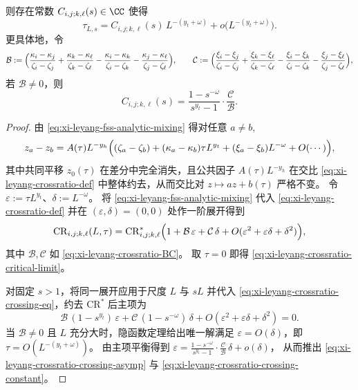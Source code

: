 \begin{theorem}
\begin{enumerate}
  则存在常数 \(C_{i,j;k,\ell}(s)\in\CC\) 使得
  \begin{equation}\label{eq:xi-leyang-crossratio-crossing-asymp}
  \tau_{L,s}
  =
  C_{i,j;k,\ell}(s)\,L^{-(y_t+\omega)}+o\!\bigl(L^{-(y_t+\omega)}\bigr).
  \end{equation}
  更具体地，令
  \begin{equation}\label{eq:xi-leyang-crossratio-BC}
  \mathcal B:=
  \Bigl(\frac{\kappa_i-\kappa_j}{\zeta_i-\zeta_j}+\frac{\kappa_k-\kappa_\ell}{\zeta_k-\zeta_\ell}
  -\frac{\kappa_i-\kappa_k}{\zeta_i-\zeta_k}-\frac{\kappa_j-\kappa_\ell}{\zeta_j-\zeta_\ell}\Bigr),
  \qquad
  \mathcal C:=
  \Bigl(\frac{\xi_i-\xi_j}{\zeta_i-\zeta_j}+\frac{\xi_k-\xi_\ell}{\zeta_k-\zeta_\ell}
  -\frac{\xi_i-\xi_k}{\zeta_i-\zeta_k}-\frac{\xi_j-\xi_\ell}{\zeta_j-\zeta_\ell}\Bigr),
  \end{equation}
  若 \(\mathcal B\neq 0\)，则
  \begin{equation}\label{eq:xi-leyang-crossratio-crossing-constant}
  C_{i,j;k,\ell}(s)=\frac{1-s^{-\omega}}{s^{y_t}-1}\cdot\frac{\mathcal C}{\mathcal B}.
  \end{equation}
\end{enumerate}
\end{theorem}
\begin{proof}
由 \eqref{eq:xi-leyang-fss-analytic-mixing} 得对任意 \(a\neq b\),
\[
z_a-z_b
=
A(\tau)L^{-y_h}\Bigl((\zeta_a-\zeta_b)+(\kappa_a-\kappa_b)\tau L^{y_t}+(\xi_a-\xi_b)L^{-\omega}+O(\cdots)\Bigr),
\]
其中共同平移 \(z_0(\tau)\) 在差分中完全消失，且公共因子 \(A(\tau)L^{-y_h}\) 在交比 \eqref{eq:xi-leyang-crossratio-def} 中整体约去，从而交比对 \(z\mapsto az+b(\tau)\) 严格不变。
令 \(\varepsilon:=\tau L^{y_t}\)、\(\delta:=L^{-\omega}\)。
将 \eqref{eq:xi-leyang-fss-analytic-mixing} 代入 \eqref{eq:xi-leyang-crossratio-def} 并在 \((\varepsilon,\delta)=(0,0)\) 处作一阶展开得到
\[
\mathrm{CR}_{i,j;k,\ell}(L,\tau)
=
\mathrm{CR}_{i,j;k,\ell}^{\ast}
\Bigl(1+\mathcal B\,\varepsilon+\mathcal C\,\delta+O(\varepsilon^{2}+\varepsilon\delta+\delta^{2})\Bigr),
\]
其中 \(\mathcal B,\mathcal C\) 如 \eqref{eq:xi-leyang-crossratio-BC}。
取 \(\tau=0\) 即得 \eqref{eq:xi-leyang-crossratio-critical-limit}。
\par
对固定 \(s>1\)，将同一展开应用于尺度 \(L\) 与 \(sL\) 并代入 \eqref{eq:xi-leyang-crossratio-crossing-eq}，约去 \(\mathrm{CR}^{\ast}\) 后主项为
\[
\mathcal B\,(1-s^{y_t})\,\varepsilon+\mathcal C\,(1-s^{-\omega})\,\delta
+O(\varepsilon^{2}+\varepsilon\delta+\delta^{2})
=0.
\]
当 \(\mathcal B\neq 0\) 且 \(L\) 充分大时，隐函数定理给出唯一解满足 \(\varepsilon=O(\delta)\)，即
\(
\tau=O(L^{-(y_t+\omega)})
\)。
由主项平衡得到
\(
\varepsilon=\frac{1-s^{-\omega}}{s^{y_t}-1}\cdot\frac{\mathcal C}{\mathcal B}\,\delta+o(\delta)
\)，
从而推出 \eqref{eq:xi-leyang-crossratio-crossing-asymp} 与 \eqref{eq:xi-leyang-crossratio-crossing-constant}。
\end{proof}

